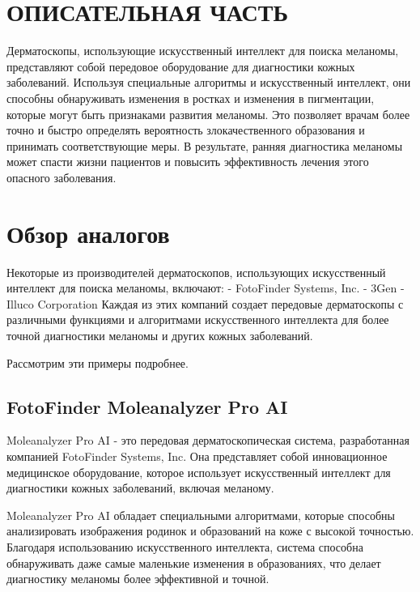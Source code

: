 \begin{sloppypar} %
\newpage %



\section{ОПИСАТЕЛЬНАЯ ЧАСТЬ} %

Дерматоскопы, использующие искусственный интеллект для поиска меланомы, представляют собой передовое оборудование для диагностики кожных заболеваний. Используя специальные алгоритмы и искусственный интеллект, они способны обнаруживать изменения в ростках и изменения в пигментации, которые могут быть признаками развития меланомы. Это позволяет врачам более точно и быстро определять вероятность злокачественного образования и принимать соответствующие меры. В результате, ранняя диагностика меланомы может спасти жизни пациентов и повысить эффективность лечения этого опасного заболевания.

\section{Обзор аналогов} %


Некоторые из производителей дерматоскопов, использующих искусственный интеллект для поиска меланомы, включают:
- FotoFinder Systems, Inc.
- 3Gen
- Illuco Corporation
Каждая из этих компаний создает передовые дерматоскопы с различными функциями и алгоритмами искусственного интеллекта для более точной диагностики меланомы и других кожных заболеваний.

Рассмотрим эти примеры подробнее.
\subsection{ FotoFinder Moleanalyzer Pro AI}
Moleanalyzer Pro AI \cite{vexia} - это передовая дерматоскопическая система, разработанная компанией FotoFinder Systems, Inc. Она представляет собой инновационное медицинское оборудование, которое использует искусственный интеллект для диагностики кожных заболеваний, включая меланому.

Moleanalyzer Pro AI обладает специальными алгоритмами, которые способны анализировать изображения родинок и образований на коже с высокой точностью. Благодаря использованию искусственного интеллекта, система способна обнаруживать даже самые маленькие изменения в образованиях, что делает диагностику меланомы более эффективной и точной.


\end{sloppypar}
